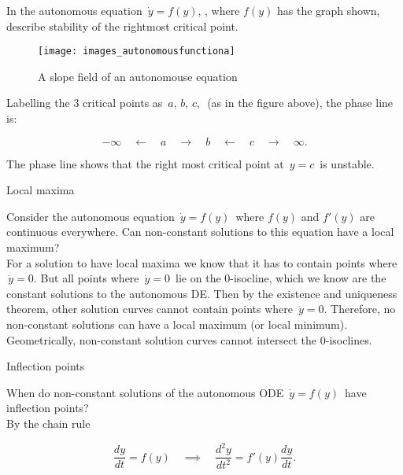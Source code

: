 In the autonomous equation $\, \dot y=f(y), \,$, where $f(y)$ has the graph shown,
describe stability of the rightmost critical point. \\

\begin{figure}[ht!]
  \centering
  \texttt{[image: images\_autonomousfunctiona]}
  \caption{A slope field of an autonomouse equation}
\end{figure}

Labelling the $3$ critical points as $\,a,\, b,\, c,\,$ (as in the figure above), the phase line is:

\begin{equation*}
  -\infty \quad \longleftarrow \quad a \quad \longrightarrow
  \quad b \quad \longleftarrow \quad c \quad \longrightarrow \quad \infty .
\end{equation*}

The phase line shows that the right most critical point at $\, y=c \,$ is unstable.

\begin{exercise}
  Local maxima
\end{exercise}

Consider the autonomous equation $\, \dot y = f(y) \,$ where $f(y)$ and $f'(y)$ are continuous everywhere.
Can non-constant solutions to this equation have a local maximum? \\

For a solution to have local maxima we know that it has to contain points
where $\, \dot y = 0$.
But all points where $\, \dot y=0 \,$ lie on the $0$-isocline,
which we know are the constant solutions to the autonomous DE.
Then by the existence and uniqueness theorem,
other solution curves cannot contain points where $\, \dot y=0$.
Therefore, no non-constant solutions can have a local maximum (or local minimum).
Geometrically, non-constant solution curves cannot intersect the $0$-isoclines.

\begin{exercise}
  Inflection points
\end{exercise}

When do non-constant solutions of the autonomous ODE $\, \dot y=f(y)\,$
have inflection points?\\

By the chain rule

\begin{equation*}
  \frac{dy}{dt} = f(y) \quad
  \implies \quad \frac{d^2y}{dt^2} = f'(y)\frac{dy}{dt}.
\end{equation*}

